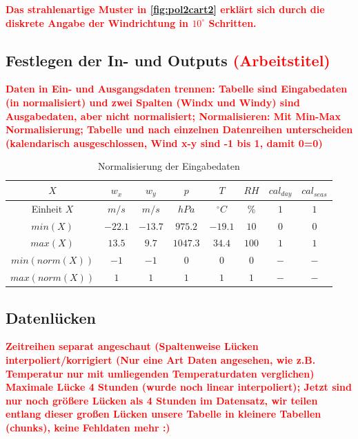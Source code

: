 \documentclass[
12pt, %
toc=listofnumbered, %
toc=chapterentrydotfill, %
numbers=noenddot, %
captions=tableheading, %
]{scrreprt}
\let\Oldsubsection\subsection
\renewcommand{\subsection}{\FloatBarrier\Oldsubsection}
\newcommand{\highlight}[1]{\textbf{\textcolor{red}{#1}}}
\newcommand{\Abb}[1]{\autoref{fig:#1}}
\begin{document}
\highlight{Das strahlenartige Muster in \Abb{pol2cart2} erklärt sich durch die diskrete Angabe der Windrichtung in $10^\circ$ Schritten.}

\subsection{Festlegen der In- und Outputs \highlight{(Arbeitstitel)}}
\highlight{Daten in Ein- und Ausgangsdaten trennen: Tabelle sind Eingabedaten (in normalisiert) und zwei Spalten (Windx und Windy) sind Ausgabedaten, aber nicht normalisiert; 
Normalisieren: Mit  Min-Max Normalisierung; Tabelle und nach einzelnen Datenreihen unterscheiden (kalendarisch ausgeschlossen, Wind x-y sind -1 bis 1, damit 0=0)}

\begin{table}[ht]
	\centering
	\caption{Normalisierung der Eingabedaten}
	\begin{tabular}{|c|c|c|c|c|c|c|c|}
		\hline
		\rowcolor{color80}
		\textbf{$X$} & \textbf{$w_x$} & \textbf{$w_y$} & \textbf{$p$} & \textbf{$T$} & \textbf{$RH$} & \textbf{$cal_{day}$} & \textbf{$cal_{seas}$} \\ \hline
		Einheit $X$ & $m/s$ & $m/s$ & $hPa$ & $^\circ C$ & \% & $1$ & $1$ \\ \hline
		$min(X)$       & $-22.1$ & $-13.7$ & $975.2$ & $-19.1$ & $10$ & $0$ & $0$ \\ \hline
		$max(X)$       & $13.5$ & $9.7$ & $1047.3$ & $34.4$ & $100$ & $1$ & $1$ \\ \hline
		$min(norm(X))$ & $-1$ & $-1$ & $0$ & $0$ & $0$ & $-$ & $-$ \\ \hline
		$max(norm(X))$ & $1$ & $1$ & $1$ & $1$ & $1$ & $-$ & $-$ \\ \hline
	\end{tabular}
\label{tab:normalisierung}
\end{table}


\subsection{Datenlücken}
\highlight{Zeitreihen separat angeschaut (Spaltenweise Lücken interpoliert/korrigiert (Nur eine Art Daten angesehen, wie z.B. Temperatur nur mit umliegenden Temperaturdaten verglichen) 
Maximale Lücke 4 Stunden (wurde noch linear interpoliert); 
Jetzt sind nur noch größere Lücken als 4 Stunden im Datensatz, wir teilen entlang dieser großen Lücken unsere Tabelle in kleinere Tabellen (chunks), keine Fehldaten mehr :)}
\end{document}
